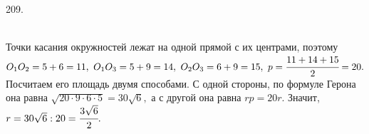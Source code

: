 209. \begin{figure}[ht!]
\end{figure}\\
Точки касания окружностей лежат на одной прямой с их центрами, поэтому $O_1O_2=5+6=11,\ O_1O_3=5+9=14,\ O_2O_3=6+9=15,\ p=\cfrac{11+14+15}{2}=20.$ Посчитаем его площадь двумя способами. С одной стороны, по формуле Герона она равна $\sqrt{20\cdot9\cdot6\cdot5}=30\sqrt{6},$ а с другой она равна $rp=20r.$ Значит, $r=30\sqrt{6}:20=\cfrac{3\sqrt{6}}{2}.$\\
